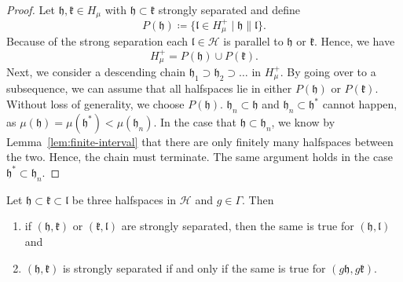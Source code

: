 \begin{proof}
  Let \(\mathfrak{h, k} \in H_\mu\) with \(\mathfrak{h} \subset \mathfrak{k}\) strongly separated and define
  \[
    P(\mathfrak{h}) \coloneqq \{\mathfrak{l} \in H_\mu^+ \mid \mathfrak{h} \parallel \mathfrak{l}\}.
  \]
  Because of the strong separation each \(\mathfrak{l} \in \mathcal{H}\) is parallel to \(\mathfrak{h}\) or \(\mathfrak{k}\). Hence, we have
  \[
    H_\mu^+ = P(\mathfrak{h}) \cup P(\mathfrak{k}).
  \]
  Next, we consider a descending chain \(\mathfrak{h_1} \supset \mathfrak{h_2} \supset \dots\) in \(H_\mu^+\). By going over to a subsequence, we can assume that all halfspaces lie in either \(P(\mathfrak{h})\) or \(P(\mathfrak{k})\). Without loss of generality, we choose \(P(\mathfrak{h})\). \(\mathfrak{h}_n \subset \mathfrak{h}\) and \(\mathfrak{h}_n \subset \mathfrak{h}^\ast\) cannot happen, as \(\mu(\mathfrak{h}) = \mu(\mathfrak{h}^\ast) < \mu(\mathfrak{h}_n)\). In the case that \(\mathfrak{h} \subset \mathfrak{h}_n\), we know by Lemma~\ref{lem:finite-interval} that there are only finitely many halfspaces between the two. Hence, the chain must terminate. The same argument holds in the case \(\mathfrak{h}^\ast \subset \mathfrak{h}_n\).
\end{proof}


\begin{lemma}
  \label{lem:strongly-sep}
  Let \(\mathfrak{h} \subset \mathfrak{k} \subset \mathfrak{l}\) be three halfspaces in \(\mathcal{H}\) and \(g \in \Gamma\). Then
  \begin{enumerate}
  \item if \((\mathfrak{h}, \mathfrak{k})\) or \((\mathfrak{k}, \mathfrak{l})\) are strongly separated, then the same is true for \((\mathfrak{h}, \mathfrak{l})\) and
  \item \((\mathfrak{h}, \mathfrak{k})\) is strongly separated if and only if the same is true for \((g\mathfrak{h}, g\mathfrak{k})\).
  \end{enumerate}
\end{lemma}

